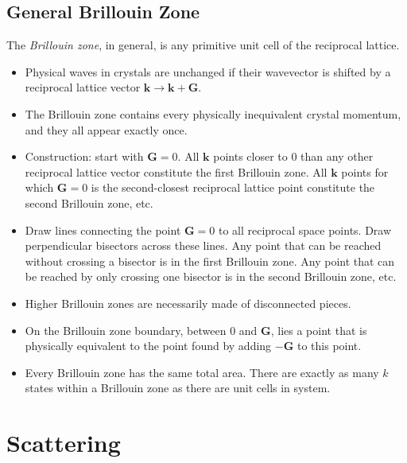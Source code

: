\documentclass[10pt]{article}
\begin{document}
\subsection{General Brillouin Zone}
The \emph{Brillouin zone}, in general, is any primitive unit cell of the reciprocal lattice.
\begin{itemize}
  \item Physical waves in crystals are unchanged if their wavevector is shifted by a reciprocal lattice vector $\textbf{k} \rightarrow \textbf{k} + \textbf{G}$.
  \item The Brillouin zone contains every physically inequivalent crystal momentum, and they all appear exactly once.
  \item Construction: start with $\textbf{G} = 0$. All $\textbf{k}$ points closer to 0 than any other reciprocal lattice vector constitute the first
  Brillouin zone. All $\textbf{k}$ points for which $\textbf{G} = 0$ is the second-closest reciprocal lattice point constitute the second Brillouin zone, etc.
  \item Draw lines connecting the point $\textbf{G} = 0$ to all reciprocal space points. Draw perpendicular bisectors across these lines. Any point that can be
  reached without crossing a bisector is in the first Brillouin zone. Any point that can be reached by only crossing one bisector is in the second Brillouin zone, etc.
  \item Higher Brillouin zones are necessarily made of disconnected pieces.
  \item On the Brillouin zone boundary, between 0 and $\textbf{G}$, lies a point that is physically equivalent to the point found by adding $-\textbf{G}$ to this point.
  \item Every Brillouin zone has the same total area. There are exactly as many $k$ states within a Brillouin zone as there are unit cells in system.
\end{itemize}

\section{Scattering}
\end{document}
